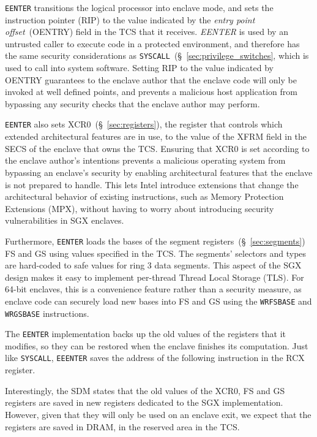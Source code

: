 \texttt{EENTER} transitions the logical processor into enclave mode, and sets
the instruction pointer (RIP) to the value indicated by the \textit{entry point
offset}~(OENTRY) field in the TCS that it receives. \textit{EENTER} is used by
an untrusted caller to execute code in a protected environment, and therefore
has the same security considerations as
\texttt{SYSCALL}~(\S~\ref{sec:privilege_switches}, which is used to call into
system software. Setting RIP to the value indicated by OENTRY guarantees to the
enclave author that the enclave code will only be invoked at well defined
points, and prevents a malicious host application from bypassing any security
checks that the enclave author may perform.


\texttt{EENTER} also sets XCR0~(\S~\ref{sec:registers}), the register that
controls which extended architectural features are in use, to the value of the
XFRM field in the SECS of the enclave that owns the TCS. Ensuring that XCR0 is
set according to the enclave author's intentions prevents a malicious operating
system from bypassing an enclave's security by enabling architectural features
that the enclave is not prepared to handle. This lets Intel introduce
extensions that change the architectural behavior of existing instructions,
such as Memory Protection Extensions (MPX), without having to worry about
introducing security vulnerabilities in SGX enclaves.

Furthermore, \texttt{EENTER} loads the bases of the segment
registers~(\S~\ref{sec:segments}) FS and GS using values specified in the TCS.
The segments' selectors and types are hard-coded to safe values for ring 3 data
segments. This aspect of the SGX design makes it easy to implement per-thread
Thread Local Storage (TLS). For 64-bit enclaves, this is a convenience feature
rather than a security measure, as enclave code can securely load new bases
into FS and GS using the \texttt{WRFSBASE} and \texttt{WRGSBASE} instructions.

The \texttt{EENTER} implementation backs up the old values of the registers
that it modifies, so they can be restored when the enclave finishes its
computation. Just like \texttt{SYSCALL}, \texttt{EEENTER} saves the address of
the following instruction in the RCX register.

Interestingly, the SDM states that the old values of the XCR0, FS and GS
registers are saved in new registers dedicated to the SGX implementation.
However, given that they will only be used on an enclave exit, we expect that
the registers are saved in DRAM, in the reserved area in the TCS.


